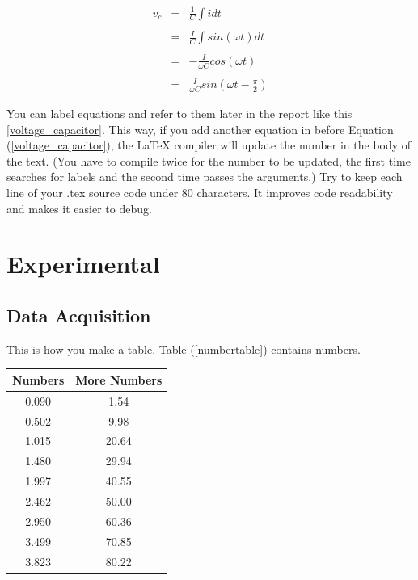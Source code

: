 \begin{eqnarray}
v_c &=& \frac{1}{C}\int{idt} \nonumber \\ \nonumber \\ %
&=& \frac{I}{C}\int{sin(\omega t)dt} \nonumber\\ \nonumber \\ %
&=& -\frac{I}{\omega C}cos(\omega t) \nonumber \\ \nonumber \\
&=& \frac{I}{\omega C}sin(\omega t - \frac{\pi}{2})	
\label{voltage_capacitor} %
\end{eqnarray} 

You can label equations and refer to them later in the report like this 
\ref{voltage_capacitor}. This way, if you add another equation in before 
Equation (\ref{voltage_capacitor}), the \LaTeX \; compiler will update the 
number in the body of the text. (You have to compile twice for the number to be 
updated, the first time searches for labels and the second time passes the arguments.) 
Try to keep each line of your .tex source code under 80 characters. 
It improves code readability and makes it easier to debug.

\pagebreak
\section{Experimental}

\subsection{Data Acquisition}
\par This is how you make a table. Table (\ref{numbertable}) contains numbers.

\begin{center}  
\vspace{.3cm} %
\small{
\begin{tabular}{c|c||} %
\hline
\hline
Numbers & More Numbers \\
\hline
\hline
0.090 &	1.54 \\ \hline %
0.502 &	9.98 \\ 
1.015 &	20.64 \\ \hline \hline
1.480 &	29.94 \\
1.997 &	40.55 \\ \hline \hline \hline
2.462 &	50.00 \\
2.950 &	60.36 \\
3.499 &	70.85 \\
3.823 &	80.22 \\
\hline
\end{tabular}}\\
\label{numbertable} 
\vspace{.4 cm}
\end{center}

